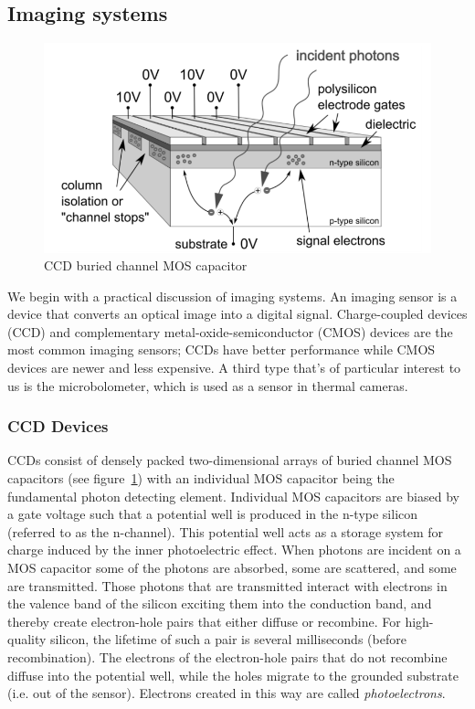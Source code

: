 \subsection{Imaging systems}\label{subsec:imaging-systems}
\begin{figure}
    \includegraphics[width=\linewidth,keepaspectratio]{figures/bccd.png}
    \caption{CCD buried channel MOS capacitor\cite{finaltestguideline}}
    \label{fig:mos-cap}
\end{figure}
We begin with a practical discussion of imaging systems.
%
An imaging sensor is a device that converts an optical image into a digital signal.
%
Charge-coupled devices (CCD) and complementary metal-oxide-semiconductor (CMOS) devices are the most common imaging sensors;
%
CCDs have better performance while CMOS devices are newer and less expensive.
%
A third type that's of particular interest to us is the microbolometer, which is used as a sensor in thermal cameras.
\subsubsection{CCD Devices}
CCDs consist of densely packed two-dimensional arrays of buried channel MOS capacitors (see figure~\ref{fig:mos-cap}) with an individual MOS capacitor being the fundamental photon detecting element.
%
Individual MOS capacitors are biased by a gate voltage such that a potential well is produced in the n-type silicon (referred to as the n-channel).
%
This potential well acts as a storage system for charge induced by the inner photoelectric effect.
%
When photons are incident on a MOS capacitor some of the photons are absorbed, some are scattered, and some are transmitted.
%
Those photons that are transmitted interact with electrons in the valence band of the silicon exciting them into the conduction band, and thereby create electron-hole pairs that either diffuse or recombine.
%
For high-quality silicon, the lifetime of such a pair is several milliseconds (before recombination)\cite{scientificccd}.
%
The electrons of the electron-hole pairs that do not recombine diffuse into the potential well, while the holes migrate to the grounded substrate (i.e. out of the sensor).
%
Electrons created in this way are called \textit{photoelectrons}.

